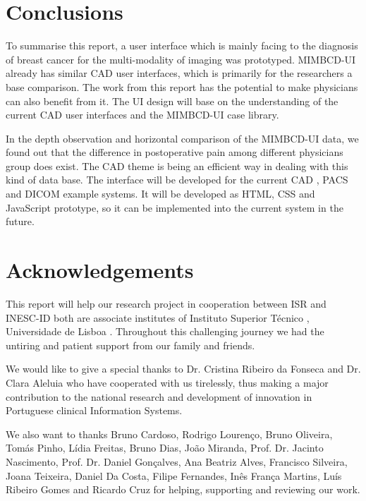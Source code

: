\section{Conclusions}

To summarise this report, a user interface which is mainly facing to the diagnosis of breast cancer for the multi-modality of imaging was prototyped. MIMBCD-UI already has similar CAD \cite{wikiCAD} user interfaces, which is primarily for the researchers a base comparison. The work from this report has the potential to make physicians can also benefit from it. The UI design will base on the understanding of the current CAD \cite{wikiCAD} user interfaces and the MIMBCD-UI case library.

In the depth observation and horizontal comparison of the MIMBCD-UI data, we found out that the difference in postoperative pain among different physicians group does exist. The CAD \cite{wikiCAD} theme is being an efficient way in dealing with this kind of data base. The interface will be developed for the current CAD \cite{wikiCAD}, PACS \cite{wikiPACS} and DICOM \cite{wikiDICOM} example systems. It will be developed as HTML, CSS and JavaScript prototype, so it can be implemented into the current system in the future.

\clearpage

\section{Acknowledgements}

This report will help our research project in cooperation between ISR \cite{isr} and INESC-ID \cite{inescid} both are associate institutes of Instituto Superior T\'{e}cnico \cite{ist}, Universidade de Lisboa \cite{ul}. Throughout this challenging journey we had the untiring and patient support from our family and friends.

We would like to give a special thanks to Dr. Cristina Ribeiro da Fonseca and Dr. Clara Aleluia who have cooperated with us tirelessly, thus making a major contribution to the national research and development of innovation in Portuguese clinical Information Systems.

We also want to thanks Bruno Cardoso, Rodrigo Louren\c{c}o, Bruno Oliveira, Tom\'{a}s Pinho, L\'{i}dia Freitas, Bruno Dias, Jo\~{a}o Miranda, Prof. Dr. Jacinto Nascimento, Prof. Dr. Daniel Gon\c{c}alves, Ana Beatriz Alves, Francisco Silveira, Joana Teixeira, Daniel Da Costa, Filipe Fernandes, In\^{e}s Fran\c{c}a Martins, Lu\'{i}s Ribeiro Gomes and Ricardo Cruz for helping, supporting and reviewing our work.

\clearpage

\printbibliography


